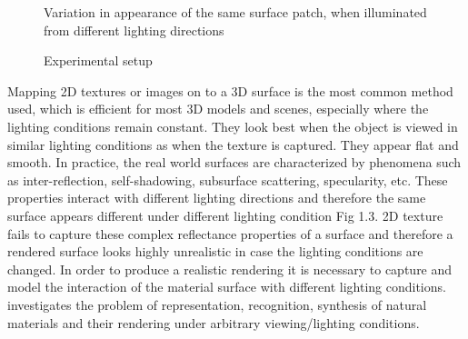 \begin{figure}[hp]
\centering
{}
\label{fig:3dtexture}
\caption{Variation in appearance of the same surface
patch, when illuminated from different lighting directions}
\label{fig:setup}
\caption{Experimental setup}
\end{figure}

Mapping 2D textures or images on to a 3D surface is the most common method used, which is
efficient for most 3D models and scenes, especially where the lighting
conditions remain constant. They look best when the object is viewed in similar lighting conditions as
when the texture is captured. They appear flat and smooth.
In practice, the real world surfaces are
characterized by phenomena such as inter-reflection, self-shadowing, subsurface
scattering, specularity, etc. These properties interact with different lighting
directions and therefore the same surface appears different under
different lighting condition Fig 1.3. 2D texture fails to capture these complex reflectance properties of a
surface and therefore a rendered surface looks highly unrealistic in case the lighting
conditions are changed. In order to produce a realistic rendering it is necessary to capture
and model the interaction of the material surface with different lighting
conditions. \cite{C1} investigates the problem of representation, recognition, synthesis of
natural materials and their rendering under arbitrary viewing/lighting conditions.

